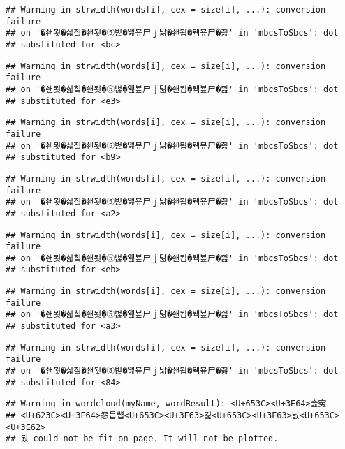 \documentclass[]{article}
\begin{document}
\begin{verbatim}
## Warning in strwidth(words[i], cex = size[i], ...): conversion failure
## on '�쇈묏�싧칰�쇈묏�⑤벊�앮뵾尸ｊ맒�쇈묍�붹뵾尸�즲' in 'mbcsToSbcs': dot
## substituted for <bc>
\end{verbatim}

\begin{verbatim}
## Warning in strwidth(words[i], cex = size[i], ...): conversion failure
## on '�쇈묏�싧칰�쇈묏�⑤벊�앮뵾尸ｊ맒�쇈묍�붹뵾尸�즲' in 'mbcsToSbcs': dot
## substituted for <e3>
\end{verbatim}

\begin{verbatim}
## Warning in strwidth(words[i], cex = size[i], ...): conversion failure
## on '�쇈묏�싧칰�쇈묏�⑤벊�앮뵾尸ｊ맒�쇈묍�붹뵾尸�즲' in 'mbcsToSbcs': dot
## substituted for <b9>
\end{verbatim}

\begin{verbatim}
## Warning in strwidth(words[i], cex = size[i], ...): conversion failure
## on '�쇈묏�싧칰�쇈묏�⑤벊�앮뵾尸ｊ맒�쇈묍�붹뵾尸�즲' in 'mbcsToSbcs': dot
## substituted for <a2>
\end{verbatim}

\begin{verbatim}
## Warning in strwidth(words[i], cex = size[i], ...): conversion failure
## on '�쇈묏�싧칰�쇈묏�⑤벊�앮뵾尸ｊ맒�쇈묍�붹뵾尸�즲' in 'mbcsToSbcs': dot
## substituted for <eb>
\end{verbatim}

\begin{verbatim}
## Warning in strwidth(words[i], cex = size[i], ...): conversion failure
## on '�쇈묏�싧칰�쇈묏�⑤벊�앮뵾尸ｊ맒�쇈묍�붹뵾尸�즲' in 'mbcsToSbcs': dot
## substituted for <a3>
\end{verbatim}

\begin{verbatim}
## Warning in strwidth(words[i], cex = size[i], ...): conversion failure
## on '�쇈묏�싧칰�쇈묏�⑤벊�앮뵾尸ｊ맒�쇈묍�붹뵾尸�즲' in 'mbcsToSbcs': dot
## substituted for <84>
\end{verbatim}

\begin{verbatim}
## Warning in wordcloud(myName, wordResult): <U+653C><U+3E64>솚寃
## <U+623C><U+3E64>怨듭썝<U+653C><U+3E63>긽<U+653C><U+3E63>닔<U+653C><U+3E62>
## 룄 could not be fit on page. It will not be plotted.
\end{verbatim}
\end{document}
